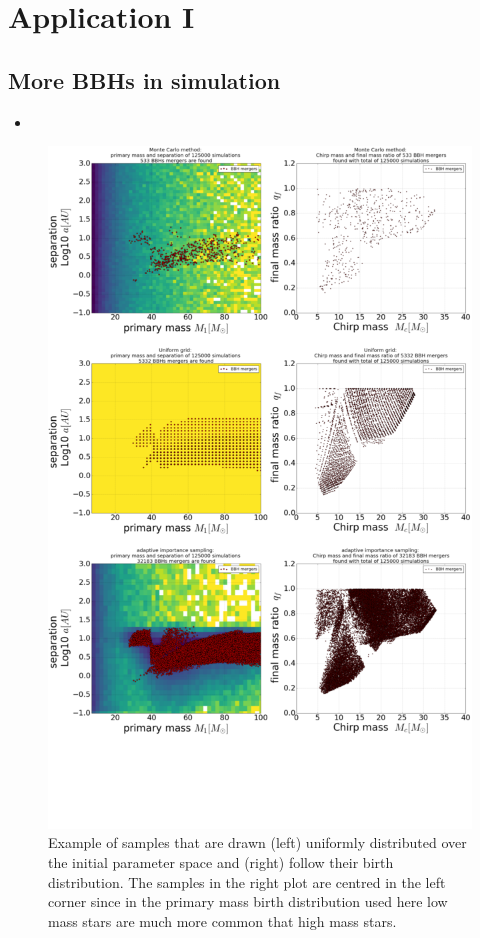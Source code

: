 \documentclass[a4paper,fleqn,usenatbib]{mnras}
\begin{document}
\section{Application I}
\label{sec:aplication-I}

\subsection{More BBHs in simulation}
\label{subsec:AISsampling}
%
%
\begin{itemize}
\item 
\end{itemize}
%


\begin{figure}
	\includegraphics[width=\columnwidth]{bbhmergers_samplingmethods_plot_density_v2_1024.png}
    \caption{Example of   samples that are drawn (left)  uniformly distributed over the initial parameter space and (right) follow their birth distribution. The samples in the right plot are centred in the left corner since in the primary mass birth distribution used here low mass stars are much more common that high mass stars. }
    \label{fig:sampling_methods}
\end{figure}
\end{document}
